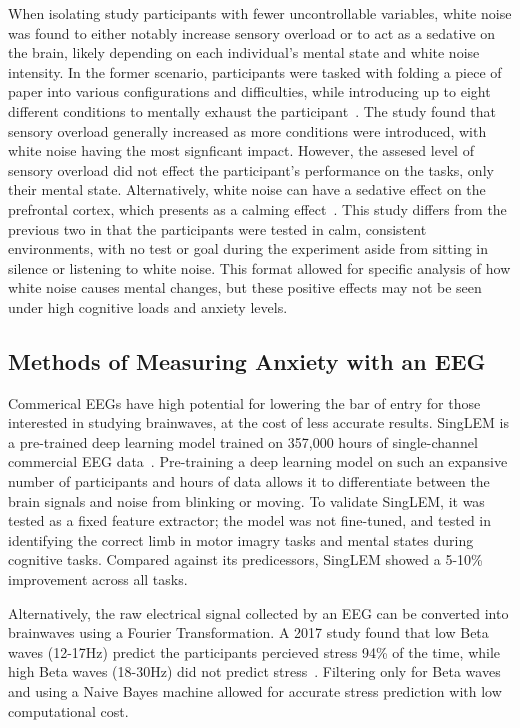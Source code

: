 \documentclass[journal]{IEEEtran}
\begin{document}
When isolating study participants with fewer uncontrollable variables, white noise was found to either notably increase sensory overload or to act as a sedative on the brain, likely depending on each individual's mental state and white noise intensity. In the former scenario, participants were tasked with folding a piece of paper into various configurations and difficulties, while introducing up to eight different conditions to mentally exhaust the participant~\cite{marzollaImpactNoiseExposure2024}. The study found that sensory overload generally increased as more conditions were introduced, with white noise having the most signficant impact. However, the assesed level of sensory overload did not effect the participant's performance on the tasks, only their mental state. Alternatively, white noise can have a sedative effect on the prefrontal cortex, which presents as a calming effect~\cite{zhangSedativeEffectWhite2025}. This study differs from the previous two in that the participants were tested in calm, consistent environments, with no test or goal during the experiment aside from sitting in silence or listening to white noise. This format allowed for specific analysis of how white noise causes mental changes, but these positive effects may not be seen under high cognitive loads and anxiety levels.

\subsection{Methods of Measuring Anxiety with an EEG}

Commerical EEGs have high potential for lowering the bar of entry for those interested in studying brainwaves, at the cost of less accurate results. SingLEM is a pre-trained deep learning model trained on 357,000 hours of single-channel commercial EEG data~\cite{sukhbaatarSingLEMSingleChannelLarge2025}. Pre-training a deep learning model on such an expansive number of participants and hours of data allows it to differentiate between the brain signals and noise from blinking or moving. To validate SingLEM, it was tested as a fixed feature extractor; the model was not fine-tuned, and tested in identifying the correct limb in motor imagry tasks and mental states during cognitive tasks. Compared against its predicessors, SingLEM showed a 5-10\% improvement across all tasks. 

Alternatively, the raw electrical signal collected by an EEG can be converted into brainwaves using a Fourier Transformation. A 2017 study found that low Beta waves (12-17Hz) predict the participants percieved stress 94\% of the time, while high Beta waves (18-30Hz) did not predict stress~\cite{muhammadumarsaeedQuantificationHumanStress2017}. Filtering only for Beta waves and using a Naive Bayes machine allowed for accurate stress prediction with low computational cost.
\end{document}
